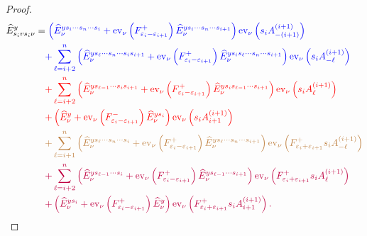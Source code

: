 \documentclass[11pt]{article}
\theoremstyle{plain}
\theoremstyle{definition}
\theoremstyle{remark}
\numberwithin{equation}{section}
\def\ev{\mathrm{ev}}
\newcounter{r}
\newcounter{s}
\begin{document}
\begin{proof}
\begin{align*}
\widehat{E}^y_{s_i vs_i\nu}
&= 
{\color{blue} 
\left(\widehat{E}^{ys_i\cdots s_n\cdots s_i }_{\nu}
+\ev_\nu\left(F_{\varepsilon_i-\varepsilon_{i+1}}^+\right) 
\widehat{E}^{ys_i \cdots s_n\cdots s_{i+1}}_{\nu}\right) \ev_\nu\left(s_iA^{(i+1)}_{-(i+1)}\right)  } \\
&\quad
{\color{blue} 
+ \sum_{\ell=i+2}^n 
\left(\widehat{E}^{ys_\ell\cdots s_n\cdots s_i s_{i+1}}_{\nu}
+\ev_\nu\left(F_{\varepsilon_i-\varepsilon_{i+1}}^+ \right)
\widehat{E}^{ys_i s_\ell\cdots s_n\cdots s_{i+1}}_{\nu}\right) \ev_\nu\left(s_i A^{(i+1)}_{-\ell}\right)
}\\
&\quad
{\color{red} 
+\sum_{\ell = i+2}^n 
\left(\widehat{E}^{ys_{\ell-1}\cdots s_i s_{i+1}}_{\nu}
+\ev_\nu\left(F_{\varepsilon_i-\varepsilon_{i+1}}^+\right) \widehat{E}^{ys_i s_{\ell-1}\cdots s_{i+1}}_{\nu}\right)
\ev_\nu \left(s_i A^{(i+1)}_{\ell}\right) }
\\
&\quad
{\color{red} 
+ \left(\widehat{E}^y_{\nu}
+\ev_\nu\left(F_{\varepsilon_i-\varepsilon_{i+1}}^- \right) \widehat{E}^{ys_i}_{\nu}\right)
\ev_\nu \left(s_i A^{(i+1)}_{i+1}\right)
}\\
&\quad
{\color{brown} 
+\sum_{\ell = i+1}^n 
\left(\widehat{E}^{ys_\ell\cdots s_n\cdots s_i }_{\nu}
+\ev_\nu\left(F_{\varepsilon_i-\varepsilon_{i+1}}^+\right) \widehat{E}^{ys_\ell\cdots s_n\cdots s_{i+1}}_{\nu}\right)
\ev_\nu\left(F_{\varepsilon_i+\varepsilon_{i+1}}^+ s_iA^{(i+1)}_{-\ell}\right)
}\\
&\quad
{\color{purple} 
+\sum_{\ell=i+2}^n 
\left(\widehat{E}^{ys_{\ell-1}\cdots s_i}_{\nu}
+\ev_\nu\left(F_{\varepsilon_i-\varepsilon_{i+1}}^+\right) \widehat{E}^{ys_{\ell-1}\cdots s_{i+1}}_{\nu} \right)
\ev_\nu\left(F_{\varepsilon_i+\varepsilon_{i+1}}^+ s_iA^{(i+1)}_{\ell}\right)
 } \\
 &\quad
{\color{purple} 
+\left(\widehat{E}^{ys_i}_{\nu}
+\ev_\nu\left(F_{\varepsilon_i-\varepsilon_{i+1}}^+ \right)\widehat{E}^{y}_{\nu}\right)
\ev_\nu\left(F_{\varepsilon_i+\varepsilon_{i+1}}^+ s_iA^{(i+1)}_{i+1}\right).
}
\end{align*}


\end{proof}
\end{document}
